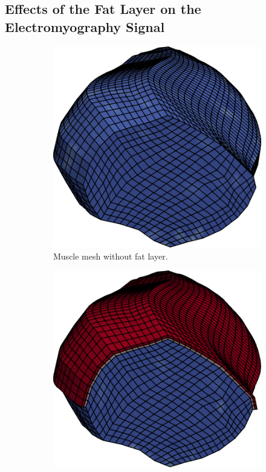 \subsection{Effects of the Fat Layer on the Electromyography Signal}

\begin{figure}[H]
  \centering%
  \begin{subfigure}[t]{0.3\textwidth}%
    \centering%
    \includegraphics[width=\textwidth]{images/results/application/fibers_emg_mesh_no_fat.png}%
    \caption{Muscle mesh without fat layer.}%
    \label{fig:fibers_emg_mesh_no_fat}%
  \end{subfigure} \quad
  \begin{subfigure}[t]{0.3\textwidth}%
    \centering%
    \includegraphics[width=\textwidth]{images/results/application/fibers_emg_mesh_thin_fat.png}%

\end{subfigure}
\end{figure}
